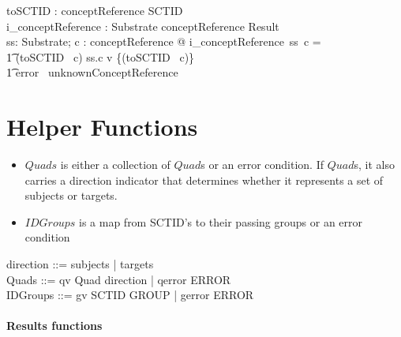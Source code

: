 \documentclass{article}
\begin{document}
\begin{zed}
[conceptReference]
\end{zed}

\begin{gendef}
   toSCTID : conceptReference \fun SCTID \\
   i\_conceptReference : Substrate \fun conceptReference \fun Result \\
\where
   \forall ss: Substrate; c : conceptReference @ i\_conceptReference~ss~c = \\
\t1 \IF (toSCTID~ c) \in ss.c \THEN v \{(toSCTID~ c)\} \\
\t1 \ELSE error~ unknownConceptReference
\end{gendef}

\section{Helper Functions}

\begin{itemize}[noitemsep,nolistsep]
\item{$Quads$} is either a collection of $Quad$s or an error condition. If $Quad$s, it also carries
a direction indicator that determines whether it represents a set of subjects or targets. 
\item{$IDGroups$} is a map from SCTID's to their passing groups or an error condition
\end{itemize}

\begin{zed}
direction ::= subjects | targets \\
Quads ::= qv \ldata \power Quad \cross direction \rdata | qerror \ldata ERROR \rdata \\
\also
IDGroups ::= gv \ldata SCTID \pfun \power GROUP \rdata | gerror \ldata ERROR \rdata
\end{zed}

\paragraph{Results functions}
\end{document}
